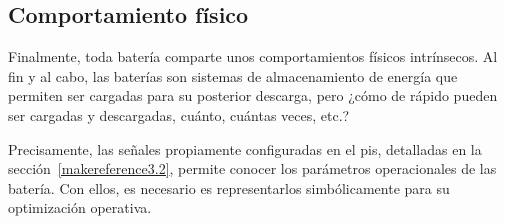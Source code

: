 \subsection{Comportamiento físico}
\label{makereference5.1.5}

Finalmente, toda batería comparte unos comportamientos físicos intrínsecos. Al fin y al cabo, las baterías son sistemas de almacenamiento de energía que permiten ser cargadas para su posterior descarga, pero ¿cómo de rápido pueden ser cargadas y descargadas, cuánto, cuántas veces, etc.?

Precisamente, las señales propiamente configuradas en el \gls{pis}, detalladas en la sección~\ref{makereference3.2}, permite conocer los parámetros operacionales de las batería. Con ellos, es necesario es representarlos simbólicamente para su optimización operativa.

